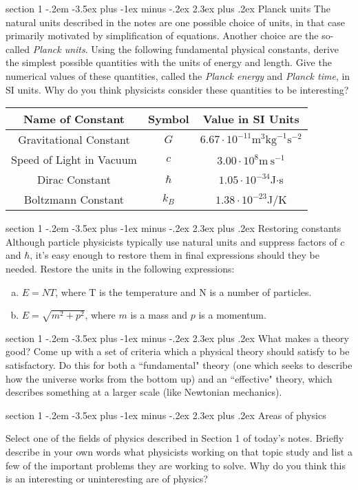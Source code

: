 \documentclass[12pt]{article}
\makeatletter
\newenvironment{problem}{\@startsection
       {section}
       {1}
       {-.2em}
       {-3.5ex plus -1ex minus -.2ex}
       {2.3ex plus .2ex}
       {\pagebreak[3]%
       \large\bf\noindent{Question }
       }
       }
       {%
       }
\makeatother
\begin{document}
\begin{problem}{Planck units}
The natural units described in the notes are one possible choice of units, in that case primarily motivated by simplification of equations. Another choice are the so-called \emph{Planck units}. Using the following fundamental physical constants, derive the simplest possible quantities with the units of energy and length. Give the numerical values of these quantities, called the \emph{Planck energy} and \emph{Planck time}, in SI units. Why do you think physicists consider these quantities to be interesting?

\begin{center}\begin{tabular}{c c c}
Name of Constant & Symbol & Value in SI Units \\\hline
Gravitational Constant & $G$ & $6.67\cdot10^{-11} \text{m}^3\text{kg}^{-1}\text{s}^{-2}$ \\
Speed of Light in Vacuum & $c$ & $3.00\cdot10^8 \text{m}\:\text{s}^{-1}$ \\ 
Dirac Constant & $\hbar$ & $1.05\cdot10^{-34}$J$\cdot$s  \\
Boltzmann Constant & $k_B$ & $1.38\cdot10^{-23}$J/K \\
\end{tabular}\end{center}
\end{problem}

\begin{problem}{Restoring constants}
Although particle physicists typically use natural units and suppress factors of $c$ and $\hbar$, it's easy enough to restore them in final expressions should they be needed. Restore the units in the following expressions:

\begin{enumerate}[a)]

\item $E=NT$, where T is the temperature and N is a number of particles.
\item $E=\sqrt{m^2+p^2}$, where $m$ is a mass and $p$ is a momentum. 

\end{enumerate}

\end{problem}


\begin{problem}{What makes a theory good?}
Come up with a set of criteria which a physical theory should satisfy to be satisfactory. Do this for both a ``fundamental" theory (one which seeks to describe how the universe works from the bottom up) and an ``effective" theory, which describes something at a larger scale (like Newtonian mechanics).
\end{problem}

\begin{problem}{Areas of physics}

Select one of the fields of physics described in Section 1 of today's notes. Briefly describe in your own words what physicists working on that topic study and list a few of the important problems they are working to solve. Why do you think this is an interesting or uninteresting are of physics?

\end{problem}
\end{document}
